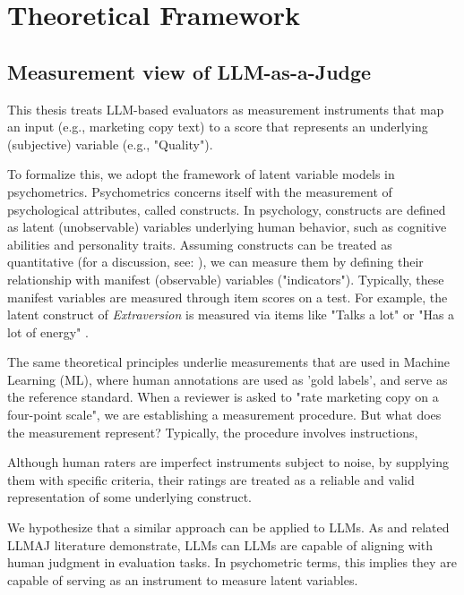 
\section{Theoretical Framework}

\subsection{Measurement view of LLM-as-a-Judge}

This thesis treats LLM-based evaluators as measurement instruments that map an input (e.g., marketing copy text) to a score that represents an underlying (subjective) variable (e.g., "Quality"). 




To formalize this, we adopt the framework of latent variable models in psychometrics. Psychometrics concerns itself with the measurement of psychological attributes, called constructs. In psychology, constructs are defined as latent (unobservable) variables underlying human behavior, such as cognitive abilities and personality traits. Assuming constructs can be treated as quantitative (for a discussion, see: \citep{borsboom2003theoretical}), we can measure them by defining their relationship with manifest (observable) variables ("indicators"). Typically, these manifest variables are measured through item scores on a test. For example, the latent construct of \textit{Extraversion} is measured via items like "Talks a lot" or "Has a lot of energy" \citep{john1991big}. 

The same theoretical principles underlie measurements that are used in Machine Learning (ML), where human annotations are used as 'gold labels', and serve as the reference standard. When a reviewer is asked to "rate marketing copy on a four-point scale", we are establishing a measurement procedure. But what does the measurement represent? Typically, the procedure involves instructions, 

Although human raters are imperfect instruments subject to noise, by supplying them with specific criteria, their ratings are treated as a reliable and valid representation of some underlying construct. 



We hypothesize that a similar approach can be applied to LLMs. As \citet{zheng_judging_2023} and related LLMAJ literature demonstrate, LLMs can LLMs are capable of aligning with human judgment in evaluation tasks. In psychometric terms, this implies they are capable of serving as an instrument to measure latent variables.

